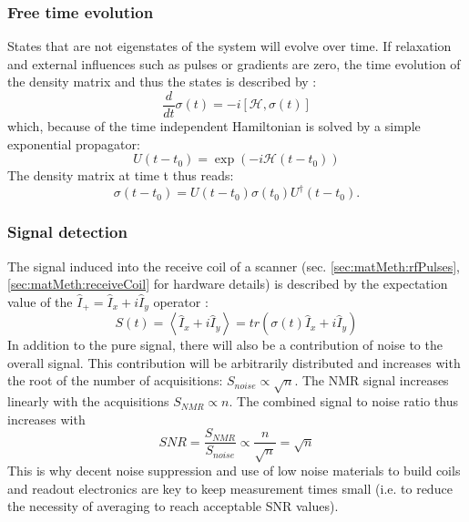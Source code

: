         \subsubsection{Free time evolution}
        \label{chap:theory:freeTimeEvolution}
        States that are not eigenstates of the system will evolve over time. If relaxation and external influences such as pulses or gradients are zero, the time evolution of the density matrix and thus the states is described by \cite{sakurai_modern_2017, levitt_spin_nodate}:
        \begin{equation}
            \frac{d}{dt} \sigma(t) = -i \left[\mathcal{H}, \sigma(t)\right]
        \end{equation}
        which, because of the time independent Hamiltonian is solved by a simple exponential propagator:
        \begin{equation*}
            U(t-t_0) = \exp(-i\mathcal{H}(t-t_0))
        \end{equation*}
        The density matrix at time t thus reads:
        \begin{equation}
            \sigma(t-t_0) = U(t-t_0) \sigma(t_0) U^\dagger(t-t_0).
        \end{equation}
        \subsubsection{Signal detection}
        The signal induced into the receive coil of a scanner (sec. \ref{sec:matMeth:rfPulses}, \ref{sec:matMeth:receiveCoil} for hardware details) is described by the expectation value of the $\hat{I}_+ = \hat{I}_x + i\hat{I}_y$ operator \cite{levitt_spin_nodate}:
        \begin{equation}
            S(t) = \left< \hat{I}_x + i\hat{I}_y \right> = tr\left(\sigma(t)\hat{I}_x + i\hat{I}_y\right)
        \end{equation}
        In addition to the pure signal, there will also be a contribution of noise to the overall signal. This contribution will be arbitrarily distributed and increases with the root of the number of acquisitions: $S_{noise} \propto \sqrt{n}$. The NMR signal increases linearly with the acquisitions $S_{NMR} \propto n$. The combined signal to noise ratio thus increases with
        \begin{equation}
            SNR =  \frac{S_{NMR}}{ S_{noise}}  \propto \frac{n}{\sqrt{n}} = \sqrt{n}
        \end{equation}
        This is why decent noise suppression and use of low noise materials to build coils and readout electronics are key to keep measurement times small (i.e. to reduce the necessity of averaging to reach acceptable SNR values).

